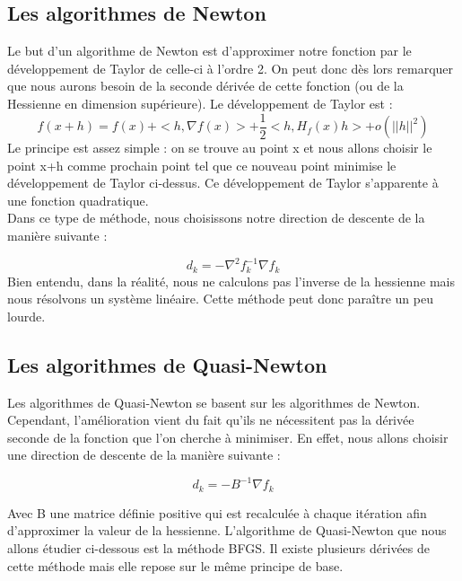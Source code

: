 \subsection{Les algorithmes de Newton}
Le but d'un algorithme de Newton est d'approximer notre fonction par le développement de Taylor de celle-ci à l'ordre 2. On peut donc dès lors remarquer que nous aurons besoin de la seconde dérivée de cette fonction (ou de la Hessienne en dimension supérieure). Le développement de Taylor est  : 
\begin{equation}
f(x+h) = f(x) + <h, \nabla f(x)> + \frac{1}{2} <h, H_f(x)h> + o(||h||^2)
\end{equation}
Le principe est assez simple : on se trouve au point x et nous allons choisir le point x+h comme prochain point tel que ce nouveau point minimise le développement de Taylor ci-dessus. Ce développement de Taylor s'apparente à une fonction quadratique.\\

Dans ce type de méthode, nous choisissons notre direction de descente de la manière suivante : 

\begin{equation}
d_k = -\nabla^2f_k^{-1}\nabla f_k
\end{equation}
Bien entendu, dans la réalité, nous ne calculons pas l'inverse de la hessienne mais nous résolvons un système linéaire. Cette méthode peut donc paraître un peu lourde.
\subsection{Les algorithmes de Quasi-Newton}
Les algorithmes de Quasi-Newton se basent sur les algorithmes de Newton. Cependant, l'amélioration vient du fait qu'ils ne nécessitent pas la dérivée seconde de la fonction que l'on cherche à minimiser. En effet, nous allons choisir une direction de descente de la manière suivante : 

\begin{equation}
d_k = -B^{-1}\nabla f_k
\end{equation}

Avec B une matrice définie positive qui est recalculée à chaque itération afin d'approximer la valeur de la hessienne. L'algorithme de Quasi-Newton que nous allons étudier ci-dessous est  la méthode BFGS. Il existe plusieurs dérivées de cette méthode mais elle repose sur le même principe de base.